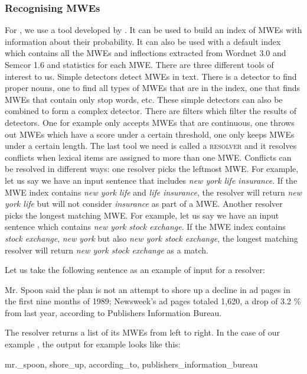 \documentclass[output=paper]{langsci/langscibook}
\begin{document}
\subsubsection{Recognising MWEs}
\label{del:mwerec}
\indent For , we use a tool developed by \citet{finlayson2011}. It can be used to build an index of MWEs with information about their probability. It can also be used with a default index which contains all the MWEs and inflections extracted from Wordnet 3.0 and Semcor 1.6 and statistics for each MWE. There are three different tools of interest to us. Simple detectors detect MWEs in text. There is a detector to find proper nouns, one to find all types of MWEs that are in the index, one that finds MWEs that contain only stop words, etc. These simple detectors can also be combined to form a complex detector. There are filters which filter the results of detectors. One for example only accepts MWEs that are continuous, one throws out MWEs which have a score under a certain threshold, one only keeps MWEs under a certain length. The last tool we need is called a \textsc{resolver} and it resolves conflicts when lexical items are assigned to more than one MWE. Conflicts can be resolved in different ways: one resolver picks the leftmost MWE. For example, let us say we have an input sentence that includes \textit{new york life insurance}. If the MWE index contains \textit{new york life} and \textit{life insurance}, the resolver will return \textit{new york life} but will not consider \textit{insurance} as part of a MWE. Another resolver picks the longest matching MWE. For example, let us say we have an input sentence which contains \textit{new york stock exchange}. If the MWE index contains \textit{stock exchange}, \textit{new york} but also \textit{new york stock exchange}, the longest matching resolver will return \textit{new york stock exchange} as a match.

Let us take the following sentence as an example of input for a resolver:

\ea\label{ex:delh:1}
    Mr. Spoon said the plan is not an attempt to shore up a decline in ad pages in the first nine months of 1989; Newsweek's ad pages totaled 1,620, a drop of 3.2 \% from last year, according to Publishers Information Bureau.
\z

The resolver returns a list of its MWEs from left to right. In the case of our example , the output for example looks like this:

\ea
    mr.\_spoon, shore\_up, according\_to, publishers\_information\_bureau
\z
\end{document}
